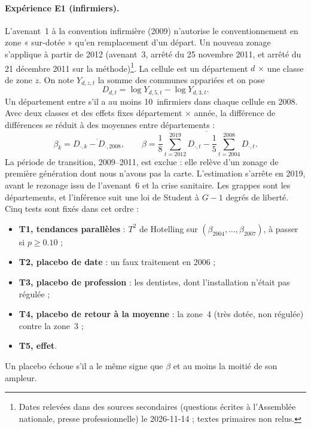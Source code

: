 \paragraph{Expérience E1 (infirmiers).} L'avenant~1 à la convention infirmière (2009) n'autorise le
conventionnement en zone « sur-dotée » qu'en remplacement d'un départ. Un nouveau zonage s'applique
à partir de 2012 (avenant~3, arrêté du 25 novembre 2011, et arrêté du 21 décembre 2011 sur la
méthode)\footnote{Dates relevées dans des sources secondaires (questions écrites à l'Assemblée
nationale, presse professionnelle) le 2026-11-14 ; textes primaires non relus.}. La cellule est un
département $d$ $\times$ une classe de zone $z$. On note $Y_{d,z,t}$ la somme des communes appariées
et on pose
\[
  D_{d,t} = \log Y_{d,5,t} - \log Y_{d,3,t}.
\]
Un département entre s'il a au moins 10\suppose{}~infirmiers dans chaque cellule en 2008. Avec deux
classes et des effets fixes département $\times$ année, la différence de différences se réduit à des
moyennes entre départements :
\[
  \beta_k = \overline{D_{\cdot,k} - D_{\cdot,2008}}, \qquad
  \beta = \overline{\textstyle\frac18\sum_{t=2012}^{2019} D_{\cdot,t}
           - \frac15\sum_{t=2004}^{2008} D_{\cdot,t}}.
\]
La période de transition, 2009--2011, est exclue : elle relève d'un zonage de première génération
dont nous n'avons pas la carte. L'estimation s'arrête en 2019, avant le rezonage issu de
l'avenant~6 et la crise sanitaire. Les grappes sont les départements, et l'inférence suit une loi de
Student à $G-1$ degrés de liberté. Cinq tests sont fixés dans cet ordre :
\begin{itemize}
  \item \textbf{T1, tendances parallèles} : $T^2$ de Hotelling sur $(\beta_{2004},\dots,\beta_{2007})$,
        à passer si $p \ge \num{0.10}$\suppose{} ;
  \item \textbf{T2, placebo de date} : un faux traitement en 2006 ;
  \item \textbf{T3, placebo de profession} : les dentistes, dont l'installation n'était pas
        régulée\suppose{} ;
  \item \textbf{T4, placebo de retour à la moyenne} : la zone~4 (très dotée, non régulée) contre la
        zone~3 ;
  \item \textbf{T5, effet}.
\end{itemize}
Un placebo échoue s'il a le même signe que $\beta$ et au moins la moitié\suppose{} de son ampleur.

